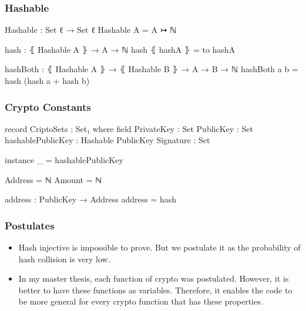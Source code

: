 \documentclass{beamer}
\begin{document}

\begin{frame}
  \frametitle{Hashable}
\begin{code}
Hashable : Set ℓ → Set ℓ
Hashable A = A ↣ ℕ
\end{code}


\begin{code}
hash : ⦃ Hashable A ⦄ → A → ℕ
hash ⦃ hashA ⦄ = to hashA

hashBoth : ⦃ Hashable A ⦄ → ⦃ Hashable B ⦄ → A → B → ℕ
hashBoth a b = hash (hash a + hash b)
\end{code}


\end{frame}


\begin{frame}
  \frametitle{Crypto Constants}
\begin{code}
record CriptoSets : Set₁ where
  field
    PrivateKey         : Set
    PublicKey          : Set
    hashablePublicKey  : Hashable PublicKey
    Signature          : Set

  instance
    _ = hashablePublicKey

  Address = ℕ
  Amount  = ℕ

  address : PublicKey → Address
  address = hash
\end{code}

\end{frame}

\begin{frame}
  \frametitle{Postulates}
  \begin{itemize}[<+->]
    \item Hash injective is impossible to prove.
      But we postulate it as the probability of hash collision is very low.
    \item In my master thesis, each function of crypto was postulated.
      However, it is better to have these functions as variables.
      Therefore, it enables the code to be more general for every crypto function that has these properties.
  \end{itemize}
\end{frame}
\end{document}
